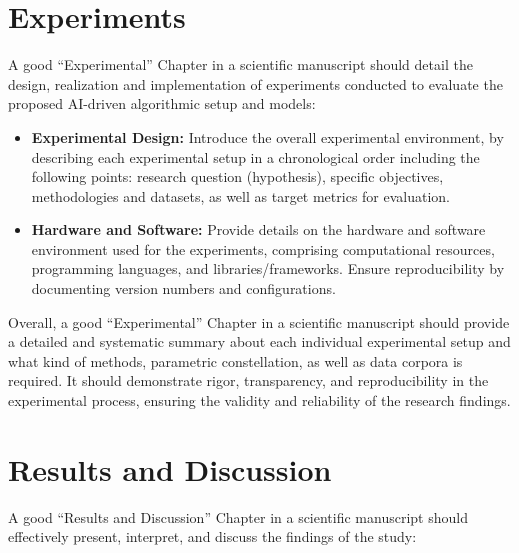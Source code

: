 \documentclass{article}
\begin{document}
\section{Experiments}

A good ``Experimental'' Chapter in a scientific manuscript should detail the design, realization and implementation of experiments conducted to evaluate the proposed AI-driven algorithmic setup and models:

\begin{itemize}
\item \textbf{Experimental Design:} Introduce the overall experimental environment, by describing each experimental setup in a chronological order including the following points: research question (hypothesis), specific objectives, methodologies and datasets, as well as target metrics for evaluation. 
\item \textbf{Hardware and Software:} Provide details on the hardware and software environment used for the experiments, comprising computational resources, programming languages, and libraries/frameworks. Ensure reproducibility by documenting version numbers and configurations.
\end{itemize}

Overall, a good ``Experimental'' Chapter in a scientific manuscript should provide a detailed and systematic summary about each individual experimental setup and what kind of methods, parametric constellation, as well as data corpora is required. It should demonstrate rigor, transparency, and reproducibility in the experimental process, ensuring the validity and reliability of the research findings.

\section{Results and Discussion}

A good ``Results and Discussion'' Chapter in a scientific manuscript should effectively present, interpret, and discuss the findings of the study:
\end{document}
